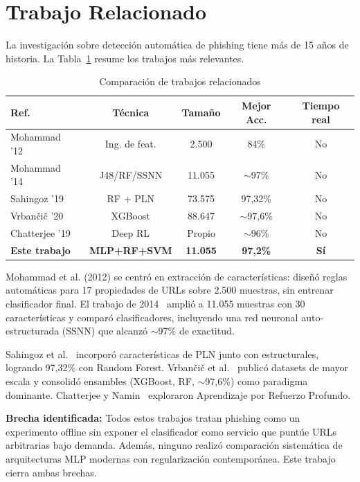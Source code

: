 \documentclass[conference]{IEEEtran}
\begin{document}
\section{Trabajo Relacionado}
La investigación sobre detección automática de phishing tiene más de 15 años de historia. La Tabla~\ref{tab:related} resume los trabajos más relevantes.

\begin{table}[t]
\centering
\caption{Comparación de trabajos relacionados}
\label{tab:related}
\begin{tabular}{lcccc}
\hline
\textbf{Ref.} & \textbf{Técnica} & \textbf{Tamaño} & \textbf{Mejor Acc.} & \textbf{Tiempo real} \\
\hline
Mohammad '12~\cite{mohammad2012} & Ing. de feat. & 2.500 & 84\% & No \\
Mohammad '14~\cite{mohammad2014} & J48/RF/SSNN & 11.055 & $\sim$97\% & No \\
Sahingoz '19~\cite{sahingoz2019} & RF + PLN & 73.575 & 97,32\% & No \\
Vrbančič '20~\cite{vrbancic2020} & XGBoost & 88.647 & $\sim$97,6\% & No \\
Chatterjee '19~\cite{chatterjee2019} & Deep RL & Propio & $\sim$96\% & No \\
\textbf{Este trabajo} & \textbf{MLP+RF+SVM} & \textbf{11.055} & \textbf{97,2\%} & \textbf{Sí} \\
\hline
\end{tabular}
\end{table}

Mohammad et al. (2012) se centró en extracción de características: diseñó reglas automáticas para 17 propiedades de URLs sobre 2.500 muestras, sin entrenar clasificador final. El trabajo de 2014~\cite{mohammad2014} amplió a 11.055 muestras con 30 características y comparó clasificadores, incluyendo una red neuronal auto-estructurada (SSNN) que alcanzó $\sim$97\% de exactitud.

Sahingoz et al.~\cite{sahingoz2019} incorporó características de PLN junto con estructurales, logrando 97,32\% con Random Forest. Vrbanči\v{c} et al.~\cite{vrbancic2020} publicó datasets de mayor escala y consolidó ensambles (XGBoost, RF, $\sim$97,6\%) como paradigma dominante. Chatterjee y Namin~\cite{chatterjee2019} exploraron Aprendizaje por Refuerzo Profundo.

\textbf{Brecha identificada:} Todos estos trabajos tratan phishing como un experimento offline sin exponer el clasificador como servicio que puntúe URLs arbitrarias bajo demanda. Además, ninguno realizó comparación sistemática de arquitecturas MLP modernas con regularización contemporánea. Este trabajo cierra ambas brechas.
\end{document}

